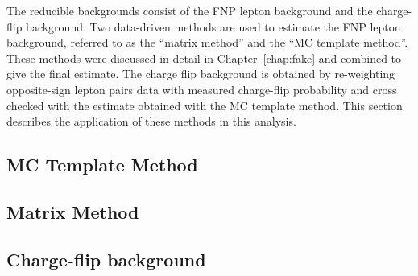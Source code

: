 The reducible backgrounds consist of the FNP lepton background and 
the charge-flip background.
Two data-driven methods are used to estimate the FNP lepton background, 
referred to as the ``matrix method'' and the ``MC template method''.
These methods were discussed in detail in Chapter~\ref{chap:fake}
and combined to give the final estimate. 
The charge flip background is obtained by re-weighting opposite-sign 
lepton pairs data with measured charge-flip probability and cross checked 
with the estimate obtained with the MC template method.
This section describes the application of these methods in this 
analysis.

\subsection{MC Template Method}\label{sec:bkg.red.mct}


\subsection{Matrix Method}\label{sec:bkg.red.mxm}


\subsection{Charge-flip background}\label{sec:bkg.red.chflip}

